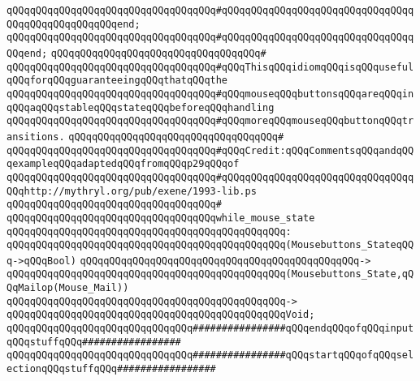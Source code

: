 \verb|qQQqqQQqqQQqqQQqqQQqqQQqqQQqqQQqqQQq#qQQqqQQqqQQqqQQqqQQqqQQqqQQqqQQqqQQqqQQqqQQqqQQqqQQqend;|\newline
\verb|qQQqqQQqqQQqqQQqqQQqqQQqqQQqqQQqqQQq#qQQqqQQqqQQqqQQqqQQqqQQqqQQqqQQqqQQqend;|\newline
\verb|qQQqqQQqqQQqqQQqqQQqqQQqqQQqqQQqqQQq#|\newline
\verb|qQQqqQQqqQQqqQQqqQQqqQQqqQQqqQQqqQQq#qQQqThisqQQqidiomqQQqisqQQqusefulqQQqforqQQqguaranteeingqQQqthatqQQqthe|\newline
\verb|qQQqqQQqqQQqqQQqqQQqqQQqqQQqqQQqqQQq#qQQqmouseqQQqbuttonsqQQqareqQQqinqQQqaqQQqstableqQQqstateqQQqbeforeqQQqhandling|\newline
\verb|qQQqqQQqqQQqqQQqqQQqqQQqqQQqqQQqqQQq#qQQqmoreqQQqmouseqQQqbuttonqQQqtransitions.|\newline
\verb|qQQqqQQqqQQqqQQqqQQqqQQqqQQqqQQqqQQq#|\newline
\verb|qQQqqQQqqQQqqQQqqQQqqQQqqQQqqQQqqQQq#qQQqCredit:qQQqCommentsqQQqandqQQqexampleqQQqadaptedqQQqfromqQQqp29qQQqof|\newline
\verb|qQQqqQQqqQQqqQQqqQQqqQQqqQQqqQQqqQQq#qQQqqQQqqQQqqQQqqQQqqQQqqQQqqQQqqQQqhttp://mythryl.org/pub/exene/1993-lib.ps|\newline
\verb|qQQqqQQqqQQqqQQqqQQqqQQqqQQqqQQqqQQq#|\newline
\verb|qQQqqQQqqQQqqQQqqQQqqQQqqQQqqQQqqQQqwhile_mouse_state|\newline
\verb|qQQqqQQqqQQqqQQqqQQqqQQqqQQqqQQqqQQqqQQqqQQqqQQq:|\newline
\verb|qQQqqQQqqQQqqQQqqQQqqQQqqQQqqQQqqQQqqQQqqQQqqQQq(Mousebuttons_StateqQQq->qQQqBool)|\newline
\verb|qQQqqQQqqQQqqQQqqQQqqQQqqQQqqQQqqQQqqQQqqQQqqQQq->|\newline
\verb|qQQqqQQqqQQqqQQqqQQqqQQqqQQqqQQqqQQqqQQqqQQqqQQq(Mousebuttons_State,qQQqMailop(Mouse_Mail))|\newline
\verb|qQQqqQQqqQQqqQQqqQQqqQQqqQQqqQQqqQQqqQQqqQQqqQQq->|\newline
\verb|qQQqqQQqqQQqqQQqqQQqqQQqqQQqqQQqqQQqqQQqqQQqqQQqVoid;|\newline
\newline
\verb|qQQqqQQqqQQqqQQqqQQqqQQqqQQqqQQq################qQQqendqQQqofqQQqinputqQQqstuffqQQq#################|\newline
\newline
\newline
\newline
\verb|qQQqqQQqqQQqqQQqqQQqqQQqqQQqqQQq################qQQqstartqQQqofqQQqselectionqQQqstuffqQQq#################|\newline
